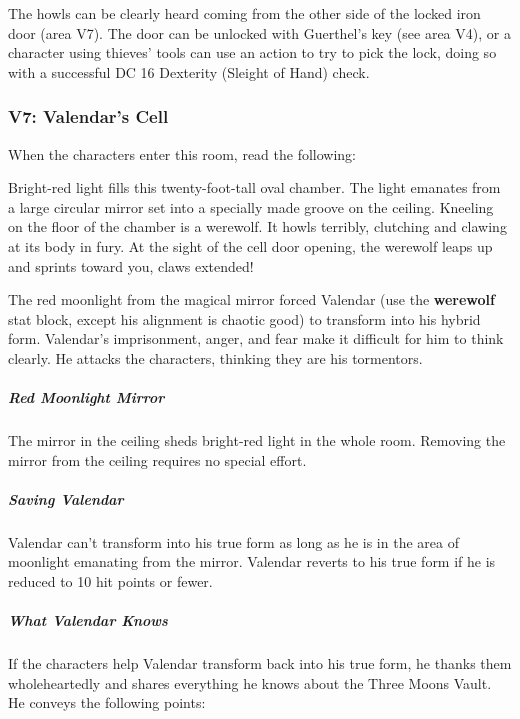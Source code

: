 \documentclass[10pt,a4paper,twoside,bg=print,twocolumn,openany,nodeprecatedcode]{dndbook}
\begin{document}
The howls can be clearly heard coming from the other side of the locked iron door (area V7). The door can be unlocked with Guerthel's key (see area V4), or a character using thieves' tools can use an action to try to pick the lock, doing so with a successful DC 16 Dexterity (Sleight of Hand) check.

\subsubsection{V7: Valendar's Cell}
When the characters enter this room, read the following:

\begin{DndReadAloud}{}
Bright-red light fills this twenty-foot-tall oval chamber. The light emanates from a large circular mirror set into a specially made groove on the ceiling. Kneeling on the floor of the chamber is a werewolf. It howls terribly, clutching and clawing at its body in fury. At the sight of the cell door opening, the werewolf leaps up and sprints toward you, claws extended!

\end{DndReadAloud}

The red moonlight from the magical mirror forced Valendar (use the \textbf{werewolf} stat block, except his alignment is chaotic good) to transform into his hybrid form. Valendar's imprisonment, anger, and fear make it difficult for him to think clearly. He attacks the characters, thinking they are his tormentors.

\subparagraph{Red Moonlight Mirror}
The mirror in the ceiling sheds bright-red light in the whole room. Removing the mirror from the ceiling requires no special effort.

\subparagraph{Saving Valendar}
Valendar can't transform into his true form as long as he is in the area of moonlight emanating from the mirror. Valendar reverts to his true form if he is reduced to 10 hit points or fewer.

\subparagraph{What Valendar Knows}
If the characters help Valendar transform back into his true form, he thanks them wholeheartedly and shares everything he knows about the Three Moons Vault. He conveys the following points:
\end{document}
